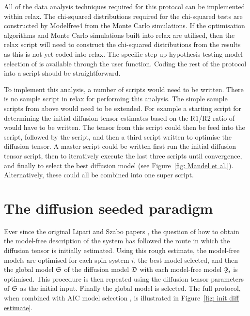 \begin{htmlonly}
\begin{htmlonly}
All of the data analysis techniques required for this protocol can be implemented within relax.  The chi-squared distributions required for the chi-squared tests are constructed by Modelfree4 from the Monte Carlo simulations.  If the optimisation algorithms and Monte Carlo simulations built into relax are utilised, then the relax script will need to construct the chi-squared distributions from the results as this is not yet coded into relax.  The specific step-up hypothesis testing model selection of \citet{Mandel95} is available through the  user function.  Coding the rest of the protocol into a script should be straightforward.

To implement this analysis, a number of scripts would need to be written.  There is no sample script in relax for performing this analysis.  The simple sample scripts from above would need to be extended.  For example a starting script for determining the initial diffusion tensor estimates based on the R1/R2 ratio of \citet{Kay89} would have to be written.  The tensor from this script could then be feed into the  script, followed by the  script, and then a third script written to optimise the diffusion tensor.  A master script could be written first run the initial diffusion tensor script, then to iteratively execute the last three scripts until convergence, and finally to select the best diffusion model (see Figure~\ref{fig: Mandel et al.}).  Alternatively, these could all be combined into one super script.




\section{The diffusion seeded paradigm}
\label{sect: diffusion seeded paradigm}

Ever since the original Lipari and Szabo papers \citep{LipariSzabo82a, LipariSzabo82b}, the question of how to obtain the model-free description of the system has followed the route in which the diffusion tensor is initially estimated.  Using this rough estimate, the model-free models are optimised for each spin system $i$, the best model selected, and then the global model $\mathfrak{S}$ of the diffusion model $\mathfrak{D}$ with each model-free model $\mathfrak{F}_i$ is optimised.  This procedure is then repeated using the diffusion tensor parameters of $\mathfrak{S}$ as the initial input.  Finally the global model is selected.  The full protocol, when combined with AIC model selection \citep{dAuvergneGooley03}, is illustrated in Figure~\ref{fig: init diff estimate}.



\end{htmlonly}
\end{htmlonly}

